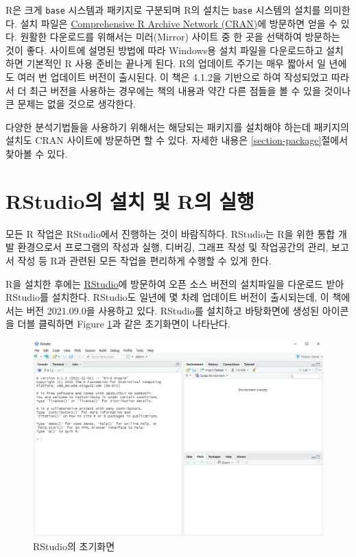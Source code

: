 \documentclass[
]{book}
\begin{document}
R은 크게 \texttt{base} 시스템과 패키지로 구분되며 R의 설치는 \texttt{base} 시스템의 설치를
의미한다. 설치 파일은 \href{https://cran.r-project.org}{Comprehensive R Archive Network (CRAN)}에 방문하면 얻을 수 있다.
원활한 다운로드를 위해서는 미러(Mirror) 사이트 중 한 곳을 선택하여
방문하는 것이 좋다. 사이트에 설명된 방법에 따라 Windows용 설치 파일을
다운로드하고 설치하면 기본적인 R 사용 준비는 끝나게 된다. R의 업데이트
주기는 매우 짧아서 일 년에도 여러 번 업데이트 버전이 출시된다. 이 책은
4.1.2을 기반으로 하여 작성되었고 따라서
더 최근 버전을 사용하는 경우에는 책의 내용과 약간 다른 점들을 볼 수
있을 것이나 큰 문제는 없을 것으로 생각한다.

다양한 분석기법들을 사용하기 위해서는 해당되는 패키지를 설치해야 하는데
패키지의 설치도 CRAN 사이트에 방문하면 할 수 있다. 자세한 내용은
\ref{section-package}절에서 찾아볼 수 있다.

\hypertarget{rstudiouxc758-uxc124uxce58-uxbc0f-ruxc758-uxc2e4uxd589}{%
\section{RStudio의 설치 및 R의 실행}\label{rstudiouxc758-uxc124uxce58-uxbc0f-ruxc758-uxc2e4uxd589}}

모든 R 작업은 RStudio에서 진행하는 것이 바람직하다. RStudio는 R을 위한
통합 개발 환경으로서 프로그램의 작성과 실행, 디버깅, 그래프 작성 및
작업공간의 관리, 보고서 작성 등 R과 관련된 모든 작업을 편리하게 수행할
수 있게 한다.

R을 설치한 후에는 \href{https://www.rstudio.com/}{RStudio}에 방문하여 오픈
소스 버전의 설치파일을 다운로드 받아 RStudio를 설치한다. RStudio도
일년에 몇 차례 업데이트 버전이 출시되는데, 이 책에서는 버전 2021.09.0을 사용하고 있다.
RStudio를 설치하고 바탕화면에 생성된 아이콘을 더블
클릭하면 Figure \ref{fig:RStudio-first}과 같은 초기화면이 나타난다.

\begin{figure}
\includegraphics[width=15.89in]{Figure/ch1_RStudio_first} \caption{RStudio의 초기화면}\label{fig:RStudio-first}
\end{figure}
\end{document}
